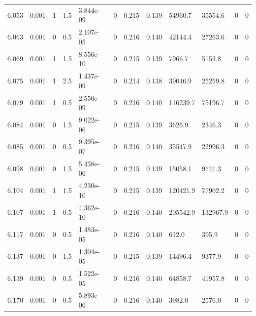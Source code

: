 \documentclass[preview]{standalone}
\begin{document}
{{{{{{{{{{\begin{tabular}{L{1.2cm}C{1.2cm} C{0.3cm}C{0.5cm} C{1.4cm}C{1.4cm} C{1.4cm}C{1.4cm} C{1.6cm}C{1.6cm} C{1.6cm}C{1.6cm}}
  6.053  &  0.001  & 1     & 1.5 &  3.844e-09  & 0  &  0.215&   0.139& 54960.7 & 35554.6   &  0 & 0  \\ 
  6.063  &  0.001  & 0     & 0.5 &  2.107e-05  & 0  &  0.216&   0.140& 42144.4 & 27263.6   &  0 & 0  \\ 
  6.069  &  0.001  & 1     & 1.5 &  8.556e-10  & 0  &  0.215&   0.139& 7966.7 & 5153.8   &  0 & 0  \\ 
  6.075  &  0.001  & 1     & 2.5 &  1.437e-09  & 0  &  0.214&   0.138& 39046.9 & 25259.8   &  0 & 0  \\ 
  6.079  &  0.001  & 1     & 0.5 &  2.550e-09  & 0  &  0.216&   0.140& 116239.7 & 75196.7   &  0 & 0  \\ 
  6.084  &  0.001  & 0     & 1.5 &  9.022e-06  & 0  &  0.215&   0.139& 3626.9 & 2346.3   &  0 & 0  \\ 
  6.085  &  0.001  & 0     & 0.5 &  9.395e-07  & 0  &  0.216&   0.140& 35547.9 & 22996.3   &  0 & 0  \\ 
  6.098  &  0.001  & 0     & 1.5 &  5.438e-06  & 0  &  0.215&   0.139& 15058.1 & 9741.3   &  0 & 0  \\ 
  6.104  &  0.001  & 1     & 1.5 &  4.230e-10  & 0  &  0.215&   0.139& 120421.9 & 77902.2   &  0 & 0  \\ 
  6.107  &  0.001  & 1     & 0.5 &  4.362e-10  & 0  &  0.216&   0.140& 205542.9 & 132967.9   &  0 & 0  \\ 
  6.117  &  0.001  & 0     & 0.5 &  1.483e-05  & 0  &  0.216&   0.140& 612.0 & 395.9   &  0 & 0  \\ 
  6.137  &  0.001  & 0     & 1.5 &  1.304e-05  & 0  &  0.215&   0.139& 14496.4 & 9377.9   &  0 & 0  \\ 
  6.139  &  0.001  & 0     & 0.5 &  1.522e-05  & 0  &  0.216&   0.140& 64858.7 & 41957.8   &  0 & 0  \\ 
  6.170  &  0.001  & 0     & 0.5 &  5.893e-06  & 0  &  0.216&   0.140& 3982.0 & 2576.0   &  0 & 0  \\ 
\hline 
\end{tabular} 

}}}}}}}}}}
\end{document}
